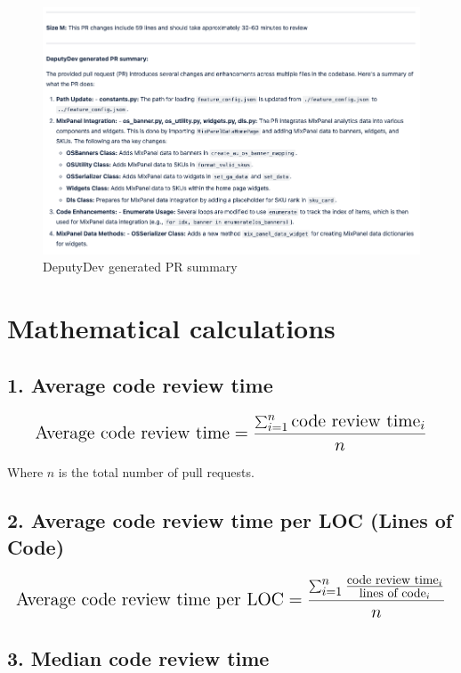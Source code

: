 \begin{appendices}
\begin{figure}[htbp]
    \centering
    \includegraphics[scale=0.50]
    {Figures/dd_comm_summary.png}
    \caption{DeputyDev generated PR summary}
    \label{fig:dd_comm_summary}
\end{figure}

\section{Mathematical calculations}
\label{app:calculations}

\subsection*{1. Average code review time}

\begin{equation}
\mathlarger{\mathlarger{\text{Average code review time} = \frac{\sum_{i=1}^{n} \text{code review time}_i}{n}}}
\end{equation}

Where $n$ is the total number of pull requests.

\subsection*{2. Average code review time per LOC (Lines of Code)}

\begin{equation}
\mathlarger{\mathlarger{\text{Average code review time per LOC} = \frac{\sum_{i=1}^{n} \frac{\text{code review time}_i}{\text{lines of code}_i}}{n}}}
\end{equation}

\subsection*{3. Median code review time}


\end{appendices}
